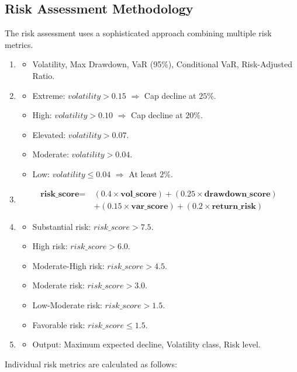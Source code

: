 \documentclass[3p,times,procedia]{elsarticle}
\begin{document}
\subsection{Risk Assessment Methodology}
The risk assessment uses a sophisticated approach combining multiple risk metrics.
\begin{enumerate}
    \item {}
    \begin{itemize}
        \item Volatility, Max Drawdown, VaR (95\%), Conditional VaR, Risk-Adjusted Ratio.
    \end{itemize}

    \item {}
    \begin{itemize}
        \item Extreme: $volatility > 0.15$  $\Rightarrow$ Cap decline at $25\%$.
        \item High: $volatility > 0.10$  $\Rightarrow$ Cap decline at $20\%$.
        \item Elevated: $volatility > 0.07$.
        \item Moderate: $volatility > 0.04$.
        \item Low: $volatility \leq 0.04$ $\Rightarrow$ At least $2\%$.
    \end{itemize}

    \item {}
\begin{align}
\textbf{risk\_score} =\ & (0.4 \times \textbf{vol\_score}) + (0.25 \times \textbf{drawdown\_score}) \nonumber \\
& + (0.15 \times \textbf{var\_score}) + (0.2 \times \textbf{return\_risk})
\end{align}

    \item {}
    \begin{itemize}
        \item Substantial risk: $risk\_score > 7.5$.
        \item High risk: $risk\_score > 6.0$.
        \item Moderate-High risk: $risk\_score > 4.5$.
        \item Moderate risk: $risk\_score > 3.0$.
        \item Low-Moderate risk: $risk\_score > 1.5$.
        \item Favorable risk: $risk\_score \leq 1.5$.
    \end{itemize}

    \item {}
    \begin{itemize}
        \item Output: Maximum expected decline, Volatility class, Risk level.
    \end{itemize}

\end{enumerate}
\vspace{1.5cm}
Individual risk metrics are calculated as follows:
\vspace{0.10cm}
\end{document}
